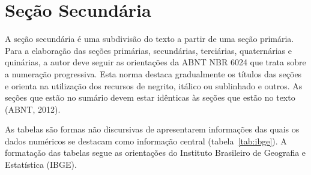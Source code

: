 \textopadrao

\textopadrao

\section{Seção Secundária}

A seção secundária é uma subdivisão do texto a partir de uma seção primária.
Para a elaboração das seções primárias, secundárias, terciárias, quaternárias
e quinárias, a autor deve seguir as orientações da ABNT NBR 6024 que trata
sobre a numeração progressiva. Esta norma destaca gradualmente os títulos das
seções e orienta na utilização dos recursos de negrito, itálico ou sublinhado
e outros. As seções que estão no sumário devem estar idênticas às seções que
estão no texto (ABNT, 2012).

As tabelas são formas não discursivas de apresentarem informações das quais os
dados numéricos se destacam como informação central (tabela~\ref{tab:ibge}). A
formatação das tabelas segue as orientações do Instituto Brasileiro de
Geografia e Estatística (IBGE).

